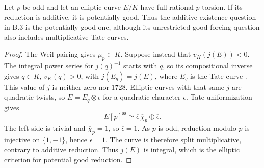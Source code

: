 \begin{lemma}
\label{lem:B-RD19}
Let $p$ be odd and let an elliptic curve $E/K$ have full rational
$p$-torsion. If its reduction is additive, it is potentially good.
Thus the additive existence question in B.3 is the potentially good
one, although its unrestricted good-forcing question also includes
multiplicative Tate curves.
\end{lemma}
\begin{proof}
The Weil pairing gives $\mu_p\subset K$. Suppose instead that
$v_K(j(E))<0$. The integral power series for $j(q)^{-1}$ starts with
$q$, so its compositional inverse gives $q\in K$, $v_K(q)>0$, with
$j(E_q)=j(E)$, where $E_q$ is the Tate curve
\cite[Theorem~1 and the $j$-expansion, pp.4--6]{Tate1995Uniformization}.
This value of $j$ is neither zero nor $1728$. Elliptic curves with
that same $j$ are quadratic twists, so $E=E_q\otimes\epsilon$ for
a quadratic character $\epsilon$. Tate uniformization gives
\[
       E[p]^{\mathrm{ss}}
        \simeq\overline\epsilon\,\overline\chi_p
                      \oplus\overline\epsilon.
\]
The left side is trivial and $\overline\chi_p=1$, so
$\overline\epsilon=1$. As $p$ is odd, reduction modulo $p$ is
injective on $\{1,-1\}$, hence $\epsilon=1$. The curve is therefore
split multiplicative, contrary to additive reduction. Thus $j(E)$
is integral, which is the elliptic criterion for potential good
reduction.
\end{proof}

